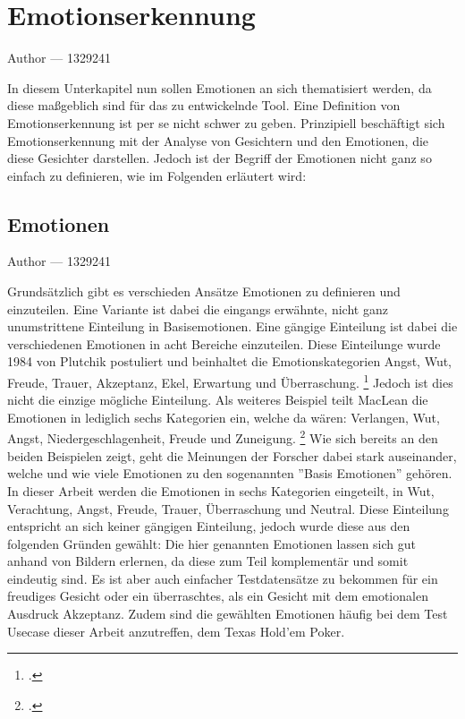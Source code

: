 \documentclass[12pt, a4paper]{report}
\makeatletter
\newcommand{\sectionauthor}[1]{%
  {\parindent0pt\vspace*{-5pt}%
  \large{Author --- }
  \linespread{1.1}\large\scshape#1%
  \par\nobreak\vspace*{35pt} }
  \@afterheading%
}
\makeatother
\begin{document}
\section{Emotionserkennung}
\sectionauthor{1329241}
In diesem Unterkapitel nun sollen Emotionen an sich thematisiert werden, da diese maßgeblich sind für das zu entwickelnde Tool. Eine Definition von Emotionserkennung ist per se nicht schwer zu geben. Prinzipiell beschäftigt sich Emotionserkennung mit der Analyse von Gesichtern und den Emotionen, die diese Gesichter darstellen. Jedoch ist der Begriff der Emotionen nicht ganz so einfach zu definieren, wie im Folgenden erläutert wird: 


\subsection{Emotionen}
\sectionauthor{1329241}
Grundsätzlich gibt es verschieden Ansätze Emotionen zu definieren und einzuteilen. Eine Variante ist dabei die eingangs erwähnte, nicht ganz unumstrittene Einteilung in Basisemotionen. Eine gängige Einteilung ist dabei die verschiedenen Emotionen in acht Bereiche einzuteilen. Diese Einteilunge wurde 1984 von Plutchik postuliert und beinhaltet die Emotionskategorien Angst, Wut, Freude, Trauer, Akzeptanz, Ekel, Erwartung und Überraschung.
\footcite[Vgl. ][3]{FaceRec}
Jedoch ist dies nicht die einzige mögliche Einteilung. Als weiteres Beispiel teilt MacLean die Emotionen in lediglich sechs Kategorien ein, welche da wären: Verlangen, Wut, Angst, Niedergeschlagenheit, Freude und Zuneigung.
\footcite[Vgl. ][3]{FaceRec}
Wie sich bereits an den beiden Beispielen zeigt, geht die Meinungen der Forscher dabei stark auseinander, welche und wie viele Emotionen zu den sogenannten ''Basis Emotionen'' gehören. In dieser Arbeit werden die Emotionen in sechs Kategorien eingeteilt, in Wut, Verachtung, Angst, Freude, Trauer, Überraschung und Neutral. Diese Einteilung entspricht an sich keiner gängigen Einteilung, jedoch wurde diese aus den folgenden Gründen gewählt: \newline
Die hier genannten Emotionen lassen sich gut anhand von Bildern erlernen, da diese zum Teil komplementär und somit eindeutig sind. Es ist aber auch einfacher Testdatensätze zu bekommen für ein
freudiges Gesicht oder ein überraschtes, als ein Gesicht mit dem emotionalen Ausdruck Akzeptanz. Zudem sind die gewählten Emotionen häufig bei dem Test Usecase dieser Arbeit anzutreffen, dem Texas Hold'em Poker.
\end{document}
